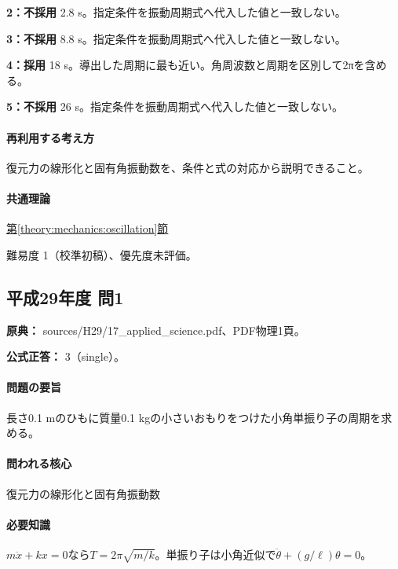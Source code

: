 \noindent\textbf{2：不採用} 2.8 s。指定条件を振動周期式へ代入した値と一致しない。\par

\noindent\textbf{3：不採用} 8.8 s。指定条件を振動周期式へ代入した値と一致しない。\par

\noindent\textbf{4：採用} 18 s。導出した周期に最も近い。角周波数と周期を区別して2πを含める。\par

\noindent\textbf{5：不採用} 26 s。指定条件を振動周期式へ代入した値と一致しない。\par

\paragraph{再利用する考え方} 復元力の線形化と固有角振動数を、条件と式の対応から説明できること。

\paragraph{共通理論} \hyperref[theory:mechanics:oscillation]{第\ref*{theory:mechanics:oscillation}節}

\par 難易度 1（校準初稿）、優先度未評価。

\subsection{平成29年度 問1}
\label{q:h29-reg-applied-01}

\noindent\textbf{原典：} sources/H29/17\_applied\_science.pdf、PDF物理1頁。

\textbf{公式正答：} 3（single）。

\paragraph{問題の要旨} 長さ0.1 mのひもに質量0.1 kgの小さいおもりをつけた小角単振り子の周期を求める。

\paragraph{問われる核心} 復元力の線形化と固有角振動数

\paragraph{必要知識} \(m\ddot x+kx=0\)なら\(T=2\pi\sqrt{m/k}\)。単振り子は小角近似で\(\ddot\theta+(g/\ell)\theta=0\)。

